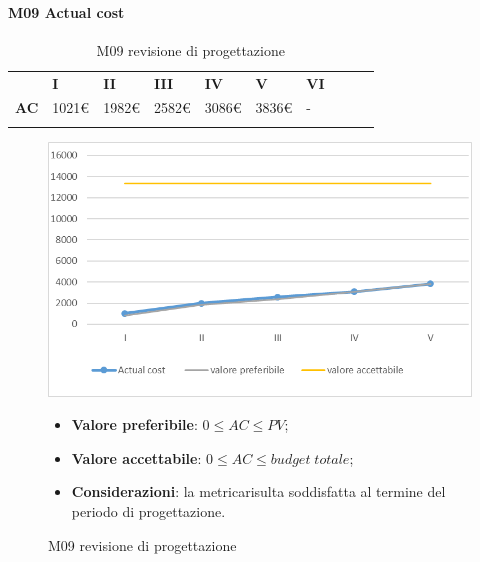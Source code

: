 \paragraph{M09 Actual cost} \mbox{}
\begin{longtable}[H!] {						
		>{}p{38mm}  		
		>{}p{12mm}
		>{}p{12mm}		
		>{}p{12mm}		
		>{}p{12mm}		
		>{}p{12mm}		
		>{}p{12mm}
		>{}p{12mm}
		>{}p{12mm}
		>{}p{12mm}
	}
	\rowcolor{gray!50}
	\textbf{} & \textbf{I} & \textbf{II} & \textbf{III} & \textbf{IV} & \textbf{V} & \textbf{VI} \TBstrut \\ [2mm]
	\textbf{AC} & 1021\euro & 1982\euro & 2582\euro & 3086\euro & 3836\euro & - \TBstrut \\ [2mm]
	\rowcolor{white}
	\caption{M09 revisione di progettazione\glo}
\end{longtable}
\begin{figure}[H] 	
\includegraphics[width=\linewidth]{./img/grafici/RP6.png}	
\caption{M09 revisione di progettazione\glo}	
\begin{itemize}
	\item \textbf{Valore preferibile}: $0\le AC \le PV$;
	\item \textbf{Valore accettabile}: $0 \le AC \le budget \; totale$;
	\item \textbf{Considerazioni}: la metrica\glosp risulta soddisfatta al termine del periodo di progettazione\glo.
\end{itemize}
\end{figure}
